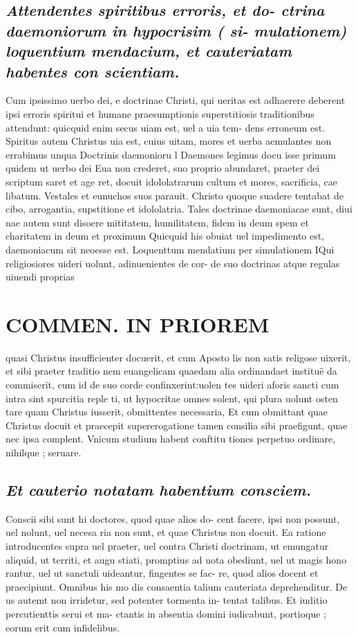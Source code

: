 \documentclass{article}
\begin{document}
\begin{pages}
\subsection*{\textit{Attendentes spiritibus erroris, et do- ctrina daemoniorum in hypocrisim ( si- mulationem) loquentium mendacium, et cauteriatam habentes con scientiam. }}\pstart Cum ipsissimo uerbo dei, e doctrinae Christi, qui ueritas est adhaerere deberent ipsi erroris spiritui et humane praesumptionis superstitiosis traditionibus attendunt: quicquid enim secus uiam est, uel a uia tem- dens erroneum est. Spiritus autem Christus uia est, cuius uitam, mores et uerba aemulantes non errabimus unqua  \pend\pstart Doctrinis daemonioru l Daemones legimus docu isse primum quidem ut uerbo dei Eua non crederet, suo proprio abundaret, praeter dei scriptum saret et age ret, docuit idololatrarum cultum et mores, sacrificia, cae libatum. Vestales et eunuchos suos parauit. Christo quoque suadere tentabat de cibo, arrogantia, supstitione et idololatria. Tales doctrinae daemoniacae sunt, diui nae autem sunt disoere mititatem, humilitatem, fidem in deum spem et charitatem in deum et proximum Quicquid his obuiat uel impedimento est, daemoniacum sit neoesse est.  \pend\pstart Loquenttum mendatium per simulationem IQui religiosiores uideri uolunt, adinuenientes de cor- de suo doctrinas atque regulas uiuendi proprias  \pend
\section*{COMMEN. IN PRIOREM }
\marginpar{[ p.96 ]}\pstart quasi Christus insufficienter docuerit, et cum Aposto lis non satis religose uixerit, et sibi praeter traditio nem euangelicam quaedam alia ordinandaet instituë da commiserit, cum id de suo corde confinxerint:uolen tes uideri aforis sancti cum intra sint spurcitia reple ti, ut hypocritae omnes solent, qui plura uolunt osten tare quam Christus iusserit, obmittentes necessaria, Et cum obmittant quae Christus docuit et praecepit supererogatione tamen consilia sibi praefigunt, quae nec ipsa complent. Vnicum studium habent conftitu tiones perpetuo ordinare, nihilque ; seruare.  \pend
{}
{}
\subsection*{\textit{Et cauterio notatam habentium consciem. }}\pstart Conscii sibi sunt hi doctores, quod quae alios do- cent facere, ipsi non possunt, uel nolunt, uel necesa ria non sunt, et quae Christus non docuit. Ea ratione introducentes supra uel praeter, uel contra Christi doctrinam, ut emungatur aliquid, ut territi, et augu stiati, promptius ad uota obediunt, uel ut magis hono rantur, uel ut sanctuli uideantur, fingentes se fac- re, quod alios docent et praecipiunt. Omnibus his mo dis consaentia talium cauteriata deprehenditur. De us autemt non irridetur, sed potenter tormenta in- tentat talibus. Et iuditio percutienttis serui et ma- ctantis in absentia domini iudicabunt, portioque ; eorum erit cum infidelibus.  \pend

\end{pages}
\end{document}
